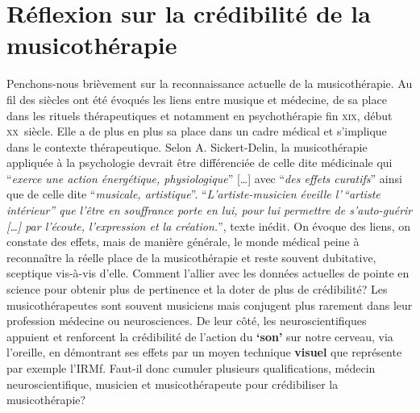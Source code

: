 \section{Réflexion sur la crédibilité de la musicothérapie }

Penchons-nous brièvement sur la reconnaissance actuelle de la musicothérapie.
Au fil des siècles ont été évoqués les liens entre musique et médecine, de sa place dans les
rituels thérapeutiques et notamment en psychothérapie fin \textsc{xix}\ieme,
début \textsc{xx}\ieme\ siècle.
Elle a de plus en plus sa place dans un cadre médical et s'implique dans le contexte thérapeutique.
Selon A. Sickert-Delin, la musicothérapie appliquée à la
psychologie devrait être différenciée de celle dite médicinale qui
\enquote{\emph{exerce une action
énergétique, physiologique}} [\dots] avec \enquote{\emph{des effets curatifs}}
ainsi que de celle dite \enquote{\emph{musicale, artistique}}.
\enquote{\emph{L'artiste-musicien éveille l'\,``artiste intérieur'' que l'être
en souffrance porte en lui, pour lui permettre de s'auto-guérir [\dots] par
l'écoute, l'expression et la création.}}\autocite[14] {viret:b},
texte inédit.
On évoque des liens, on constate des effets, mais de manière générale, le monde médical peine à reconnaître la réelle place de la musicothérapie et reste souvent dubitative, sceptique vis-à-vis d'elle.
 Comment l'allier avec les données actuelles de pointe en
science pour obtenir plus de pertinence
et la doter de plus de crédibilité?
Les musicothérapeutes sont souvent musiciens mais conjugent plus
rarement dans leur profession
médecine ou neurosciences. De leur côté, les neuroscientifiques appuient
et renforcent la crédibilité de l'action du \textbf{`son'} sur notre cerveau, via
l'oreille, en démontrant ses effets par un moyen technique
\textbf{visuel} que représente par exemple l'IRMf. 
Faut-il donc cumuler plusieurs qualifications, médecin neuroscientifique,  musicien et musicothérapeute pour crédibiliser la musicothérapie?
